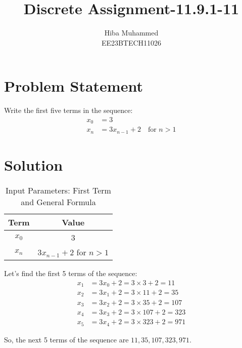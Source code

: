 \documentclass[12pt]{article}
\begin{document}
\title{Discrete Assignment-11.9.1-11}
\author{Hiba Muhammed \\
        EE23BTECH11026}
\maketitle

\section*{Problem Statement}
Write the first five terms in the sequence:
\[
\begin{aligned}
x_0 &= 3 \\
x_n &= 3x_{n-1} + 2 \quad \text{for } n > 1
\end{aligned}
\]

\section*{Solution}
\begin{table}[h]
  \centering
  \caption{Input Parameters: First Term and General Formula}
  \begin{tabular}{|c|c|}
    \hline
    \textbf{Term} & \textbf{Value} \\
    \hline
    \(x_0\) & 3 \\
    \(x_{n}\) & \(3x_{n-1} + 2\) for \(n > 1\) \\
    \hline
  \end{tabular}
\end{table}
Let's find the first 5 terms of the sequence:
\begin{align}
x_1 &= 3x_0 + 2 = 3 \times 3 + 2 = 11 \\x_2 &= 3x_1 + 2 = 3 \times 11 + 2 = 35 \\
x_3 &= 3x_2 + 2 = 3 \times 35 + 2 = 107 \\x_4 &= 3x_3 + 2 = 3 \times 107 + 2 = 323 \\
x_5 &= 3x_4 + 2 = 3 \times 323 + 2 = 971 
\end{align}

So, the next 5 terms of the sequence are \(11, 35, 107, 323, 971\).
\end{document}
